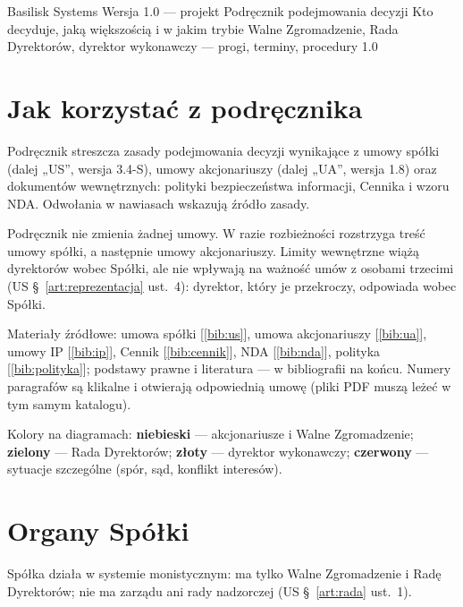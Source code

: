 \documentclass[11pt,a4paper]{report}
\newcommand{\Zr}[1]{[\ref{bib:#1}]}
\begin{document}
\BusinessPlanTitlePage
  {Basilisk Systems}
  {Wersja 1.0 --- projekt}
  {Podręcznik podejmowania decyzji}
  {Kto decyduje, jaką większością i w jakim trybie}
  {Walne Zgromadzenie, Rada Dyrektorów, dyrektor wykonawczy --- progi, terminy, procedury}
  {1.0}

\tableofcontents
\newpage

\section{Jak korzystać z podręcznika}

Podręcznik streszcza zasady podejmowania decyzji wynikające z umowy spółki (dalej „US”, wersja 3.4-S), umowy akcjonariuszy (dalej „UA”, wersja 1.8) oraz dokumentów wewnętrznych: polityki bezpieczeństwa informacji, Cennika i wzoru NDA. Odwołania w nawiasach wskazują źródło zasady.

\begin{Uwaga}
Podręcznik nie zmienia żadnej umowy. W razie rozbieżności rozstrzyga treść umowy spółki, a następnie umowy akcjonariuszy. Limity wewnętrzne wiążą dyrektorów wobec Spółki, ale nie wpływają na ważność umów z osobami trzecimi (US §~\ref{art:reprezentacja} ust.~4): dyrektor, który je przekroczy, odpowiada wobec Spółki.
\end{Uwaga}

Materiały źródłowe: umowa spółki \Zr{us}, umowa akcjonariuszy \Zr{ua}, umowy IP \Zr{ip}, Cennik \Zr{cennik}, NDA \Zr{nda}, polityka \Zr{polityka}; podstawy prawne i literatura --- w bibliografii na końcu. Numery paragrafów są klikalne i otwierają odpowiednią umowę (pliki PDF muszą leżeć w tym samym katalogu).

Kolory na diagramach: \textcolor{cWZ}{\textbf{niebieski}} --- akcjonariusze i Walne Zgromadzenie; \textcolor{cRD}{\textbf{zielony}} --- Rada Dyrektorów; \textcolor{cDW}{\textbf{złoty}} --- dyrektor wykonawczy; \textcolor{cX}{\textbf{czerwony}} --- sytuacje szczególne (spór, sąd, konflikt interesów).

\section{Organy Spółki}

Spółka działa w systemie monistycznym: ma tylko Walne Zgromadzenie i Radę Dyrektorów; nie ma zarządu ani rady nadzorczej (US §~\ref{art:rada} ust.~1).
\end{document}
